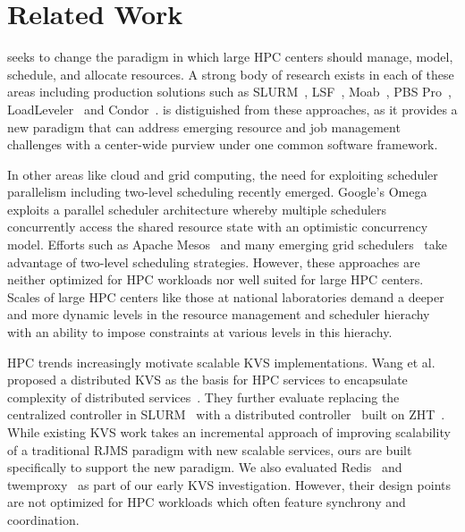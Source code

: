 \section{Related Work}
\flux seeks to change the paradigm in which 
large HPC centers should manage, model, schedule, and
allocate resources. 
A strong body of research exists in each of these areas 
including production solutions such as SLURM~\cite{Jette02slurm}, 
LSF~\cite{LSF}, Moab~\cite{MOAB}, 
PBS Pro~\cite{PSBPro}, LoadLeveler~\cite{LL}
and Condor~\cite{Litzkow88}.
\flux is distiguished from these approaches, as it provides
a new paradigm that can address emerging resource and
job management challenges 
with a center-wide purview under one common 
software framework. 

In other areas like cloud and grid computing, the need 
for exploiting scheduler parallelism including two-level 
scheduling recently emerged. 
Google's Omega~\cite{Omega} exploits 
a parallel scheduler architecture whereby multiple
schedulers concurrently access the shared resource state
with an optimistic concurrency model. Efforts
such as Apache Mesos~\cite{Mesos} and many emerging
grid schedulers~\cite{MultilevelGrid,Oar} 
take advantage of two-level scheduling strategies.
However, these approaches are neither optimized for HPC workloads 
nor well suited for large HPC centers. 
Scales of large HPC centers like those at national laboratories
demand a deeper and more dynamic levels in the resource management 
and scheduler hierachy with an ability to impose constraints 
at various levels in this hierachy.

HPC trends increasingly motivate scalable KVS implementations. 
Wang et al. proposed a distributed KVS 
as the basis for HPC services to encapsulate
complexity of distributed services~\cite{Wang:2013:USE:2503210.2503239}.
%
They further evaluate replacing the centralized controller in
SLURM~\cite{Jette02slurm} with a distributed controller~\cite{Slurmpp}
built on ZHT~\cite{Li:2013:ZLR:2510661.2511401}.
While existing KVS work takes an incremental approach of improving 
scalability of a traditional RJMS paradigm with new scalable services,
ours are built specifically to support the new paradigm. 
We also evaluated Redis~\cite{Redis} and twemproxy~\cite{Twemproxy}
as part of our early KVS investigation.
However, their design points are not optimized
for HPC workloads which often feature synchrony and coordination. 
%

